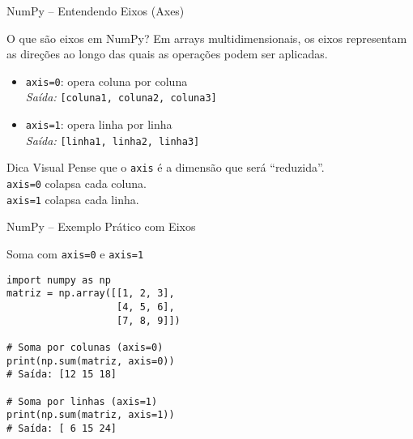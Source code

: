\begin{frame}[fragile]{NumPy – Entendendo Eixos (Axes)}
    \begin{block}{O que são eixos em NumPy?}
        Em arrays multidimensionais, os eixos representam as direções ao longo das quais as operações podem ser aplicadas.
        \begin{itemize}
            \item \texttt{axis=0}: opera coluna por coluna\\
                  \textit{Saída:} \texttt{[coluna1, coluna2, coluna3]}

            \item \texttt{axis=1}: opera  linha por linha\\
                  \textit{Saída:} \texttt{[linha1, linha2, linha3]}
        \end{itemize}
    \end{block}

    \begin{alertblock}{Dica Visual}
        Pense que o \texttt{axis} é a dimensão que será “reduzida”.\\
        \texttt{axis=0} colapsa cada coluna.\\
        \texttt{axis=1} colapsa cada linha.
    \end{alertblock}
\end{frame}


\begin{frame}[fragile]{NumPy – Exemplo Prático com Eixos}
    \begin{exampleblock}{Soma com \texttt{axis=0} e \texttt{axis=1}}
        \begin{verbatim}
import numpy as np
matriz = np.array([[1, 2, 3],
                   [4, 5, 6],
                   [7, 8, 9]])

# Soma por colunas (axis=0)
print(np.sum(matriz, axis=0))
# Saída: [12 15 18]

# Soma por linhas (axis=1)
print(np.sum(matriz, axis=1))
# Saída: [ 6 15 24]
\end{verbatim}
    \end{exampleblock}
\end{frame}


